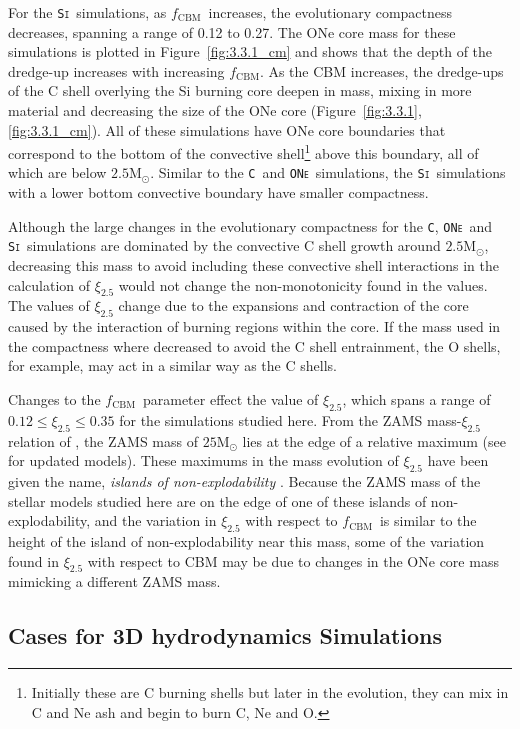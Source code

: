 \documentclass[useAMS,usenatbib]{mn2e}
\newcommand{\Msun}{\ensuremath{\mathrm{M}_\odot}}
\newcommand{\fcbm}{\ensuremath{f_\mathrm{CBM}}}
\newcommand{\C}{\textsc{\texttt{C}}}
\newcommand{\ONe}{\textsc{\texttt{ONe}}}
\newcommand{\Si}{\textsc{\texttt{Si}}}
\begin{document}
For the \Si~simulations, as \fcbm~increases, the evolutionary compactness 
decreases, spanning a range of 0.12 to 0.27. The ONe core mass for these 
simulations is plotted in Figure~\ref{fig:3.3.1_cm} and shows that the depth 
of the dredge-up increases with increasing \fcbm. As the CBM increases, 
the dredge-ups of the C shell overlying the Si burning core deepen in mass, 
mixing in more material and decreasing the size of the ONe core 
(Figure~\ref{fig:3.3.1}, \ref{fig:3.3.1_cm}). All of these simulations have ONe 
core boundaries that correspond to the bottom of the convective shell\footnote{
    Initially these are C burning shells but later in the evolution, they can mix in 
    C and Ne ash and begin to burn C, Ne and O.
    } above this boundary, all of which are below $2.5\Msun$. Similar to the \C\ 
and \ONe\ simulations, the \Si\ simulations with a lower bottom convective 
boundary have smaller compactness.

Although the large changes in the evolutionary compactness for the \C, \ONe\ 
and \Si\ simulations are dominated by the convective C shell growth 
around $2.5\Msun$, decreasing this mass to avoid including these convective
shell interactions in the calculation of $\xi_{2.5}$ would not change the 
non-monotonicity found in the values. The values of $\xi_{2.5}$ change due 
to the expansions and contraction of the core caused by the interaction of 
burning regions within the core. If the mass used in the compactness where 
decreased to avoid the C shell entrainment, the O shells, for example, may 
act in a similar way as the C shells.

Changes to the \fcbm~parameter effect the value of $\xi_{2.5}$, which spans a 
range of $0.12 \leq \xi_{2.5} \leq 0.35$ for the simulations studied here. From 
the ZAMS mass-$\xi_{2.5}$ relation of \citet{Sukhbold2014}, the ZAMS mass 
of $25 \mathrm{M}_{\odot}$ lies at the edge of a relative maximum 
(see \citet{Sukhbold2017} for updated models). These maximums in the mass 
evolution of $\xi_{2.5}$ have been given the name, \textit{islands of 
non-explodability} \citep{Sukhbold2014}. Because the ZAMS mass of the 
stellar models studied here are on the edge of one of these islands of 
non-explodability, and the variation in $\xi_{2.5}$ with respect to \fcbm~is 
similar to the height of the island of non-explodability near this mass, 
some of the variation found in $\xi_{2.5}$ with respect to CBM may be due to 
changes in the ONe core mass mimicking a different ZAMS mass. 

\subsection{Cases for 3D hydrodynamics Simulations}\label{sec:3D hydro}
\end{document}
